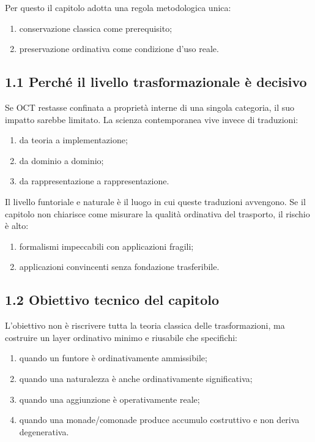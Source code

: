 Per questo il capitolo adotta una regola metodologica unica:

\begin{enumerate}
\def\labelenumi{\arabic{enumi}.}
\tightlist
\item
  conservazione classica come prerequisito;
\item
  preservazione ordinativa come condizione d'uso reale.
\end{enumerate}

\subsection{1.1 Perché il livello trasformazionale è decisivo}

Se OCT restasse confinata a proprietà interne di una singola categoria, il suo impatto sarebbe limitato. La scienza contemporanea vive invece di traduzioni:

\begin{enumerate}
\def\labelenumi{\arabic{enumi}.}
\tightlist
\item
  da teoria a implementazione;
\item
  da dominio a dominio;
\item
  da rappresentazione a rappresentazione.
\end{enumerate}

Il livello funtoriale e naturale è il luogo in cui queste traduzioni avvengono. Se il capitolo non chiarisce come misurare la qualità ordinativa del trasporto, il rischio è alto:

\begin{enumerate}
\def\labelenumi{\arabic{enumi}.}
\tightlist
\item
  formalismi impeccabili con applicazioni fragili;
\item
  applicazioni convincenti senza fondazione trasferibile.
\end{enumerate}

\subsection{1.2 Obiettivo tecnico del capitolo}

L'obiettivo non è riscrivere tutta la teoria classica delle trasformazioni, ma costruire un layer ordinativo minimo e riusabile che specifichi:

\begin{enumerate}
\def\labelenumi{\arabic{enumi}.}
\tightlist
\item
  quando un funtore è ordinativamente ammissibile;
\item
  quando una naturalezza è anche ordinativamente significativa;
\item
  quando una aggiunzione è operativamente reale;
\item
  quando una monade/comonade produce accumulo costruttivo e non deriva degenerativa.
\end{enumerate}

